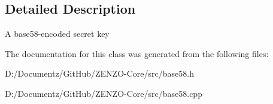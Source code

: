 \subsection{Detailed Description}
A base58-\/encoded secret key 

The documentation for this class was generated from the following files\+:\begin{DoxyCompactItemize}
\item 
D\+:/\+Documentz/\+Git\+Hub/\+Z\+E\+N\+Z\+O-\/\+Core/src/base58.\+h\item 
D\+:/\+Documentz/\+Git\+Hub/\+Z\+E\+N\+Z\+O-\/\+Core/src/base58.\+cpp\end{DoxyCompactItemize}
